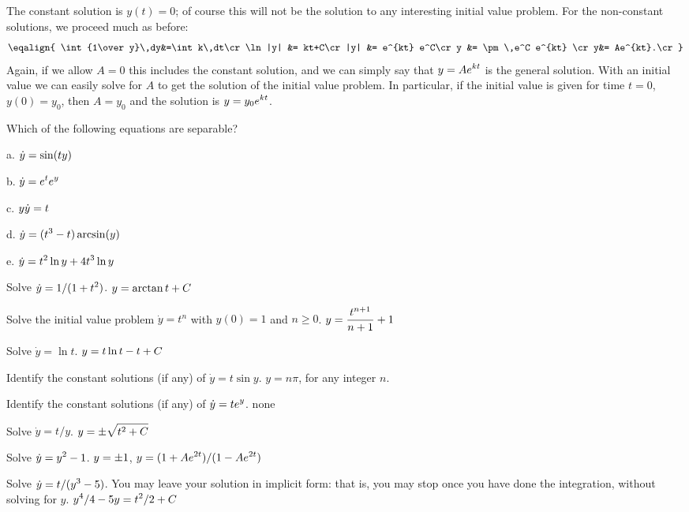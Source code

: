 The constant solution is $y(t)=0$; of course this will not be the
solution to any interesting initial value problem. 
For the non-constant solutions, we proceed much as before:
$$\eqalign{
\int {1\over y}\,dy&=\int k\,dt\cr
\ln|y| &= kt+C\cr
|y| &= e^{kt} e^C\cr
y &= \pm \,e^C e^{kt} \cr
y&= Ae^{kt}.\cr}$$
Again, if we allow $A=0$ this includes the constant solution, and we
can simply say that $\displaystyle y=Ae^{kt}$ is the general solution. With an
initial value we can easily solve for $A$ to get the solution of the
initial value problem. In particular, if the initial value is
given for time $t=0$, $y(0)=y_0$, then $A=y_0$ and the solution
is $\displaystyle y= y_0 e^{kt}$.
\endexample

\exercises

\exercise Which of the following equations are separable?

\beginlist
\item{a.} $\displaystyle \dot{y} = \sin (ty)$
\item{b.} $\displaystyle \dot{y} = e^t e^y $
\item{c.} $\displaystyle y\dot{y} = t $
\item{d.} $\displaystyle \dot{y} = (t^3 -t) \arcsin(y)$
\item{e.} $\displaystyle \dot{y} = t^2 \ln y + 4t^3 \ln y $

\endlist
\endexercise

\exercise Solve $\displaystyle\dot{y} = 1/(1+t^2)$.
\answer $\displaystyle y=\arctan t + C$
\endanswer
\endexercise

\exercise Solve the initial value problem $\dot{y} = t^n$ with
$y(0)=1$ and $n\ge 0$.
\answer $\displaystyle y={t^{n+1}\over n+1}+1$
\endanswer
\endexercise

\exercise Solve $\dot{y} = \ln t$. 
\answer $\displaystyle y=t\ln t-t+C$
\endanswer
\endexercise

\exercise Identify the constant solutions (if any) of $\dot{y} =t\sin y$.
\answer $y=n\pi$, for any integer $n$.
\endanswer
\endexercise

\exercise Identify the constant solutions (if any) of $\displaystyle\dot{y}=te^y$.
\answer none
\endanswer
\endexercise

\exercise Solve $\dot{y} = t/y$.
\answer $\displaystyle y=\pm\sqrt{t^2+C}$
\endanswer
\endexercise

\exercise Solve $\displaystyle\dot{y} = y^2 -1$.
\answer $\displaystyle y=\pm 1$, $\displaystyle y=(1+Ae^{2t})/(1-Ae^{2t})$
\endanswer
\endexercise

\exercise Solve $\displaystyle\dot{y} = t/(y^3 - 5)$. You may leave
your solution in implicit form: that is, you may stop once you have
done the integration, without solving for $y$.
\answer $\displaystyle y^4/4-5y=t^2/2+C$
\endanswer
\endexercise

